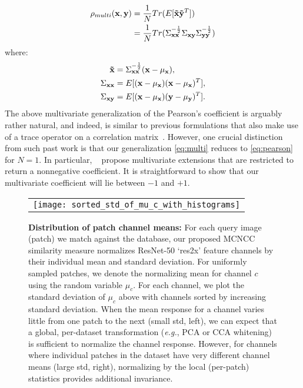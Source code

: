 \documentclass[twocolumn]{svjour3}           %
\newcommand{\eg}{\emph{e.g.}}
\begin{document}
\begin{align}
  \rho_{multi}({\bf x},{\bf y}) &= \frac{1}{N} Tr( E[{\bf \tilde{x} \tilde{y}}^T]) \label{eq:multi}\\
    &= \frac{1}{N}Tr( \Sigma_{\bf xx}^{-\frac{1}{2}} \Sigma_{\bf xy} \Sigma_{\bf yy}^{-\frac{1}{2}}) \nonumber
\end{align}
where:
\begin{align}
  \nonumber{\bf \tilde{x}} &= \Sigma_{\bf xx}^{-\frac{1}{2}}({\bf x} - \mu_{\bf x}), \\
  \nonumber\Sigma_{\bf xx} &= E[({\bf x} - {\bf \mu_x}) ({\bf x} - {\bf \mu_x})^T], \\
  \nonumber\Sigma_{\bf xy} &= E[({\bf x} - {\bf \mu_x}) ({\bf y} - {\bf \mu_y})^T].
\end{align}
The above multivariate generalization of the Pearson's coefficient is arguably
rather natural, and indeed, is similar to previous formulations that also make use
of a trace operator on a correlation
matrix~\cite{martin1979multivariate,popper1974multivariate}. However, one
crucial distinction from such past work is that our generalization
\eqref{eq:multi} reduces to \eqref{eq:pearson} for $N=1$. In particular,
~\cite{martin1979multivariate,popper1974multivariate} propose multivariate
extensions that are restricted to return a nonnegative coefficient. It is
straightforward to show that our multivariate coefficient will lie between $-1$
and $+1$.

\begin{figure}[t]
\begin{center}
\begin{tabular}{c}
  \texttt{[image: sorted\_std\_of\_mu\_c\_with\_histograms]}
  \end{tabular}\vspace{-2mm}
  \end{center}
  \caption{\textbf{Distribution of patch channel means: } 
    For each query image (patch) we match against the database, our proposed
    MCNCC similarity measure normalizes ResNet-50 `res2x' feature channels by
    their individual mean and standard deviation.  For uniformly sampled
    patches, we denote the normalizing mean for channel $c$ using the random
    variable $\mu_c$. For each channel, we plot the standard deviation of
    $\mu_c$ above with channels sorted by increasing standard deviation. When
    the mean response for a channel varies little from one patch to the next
    (small std, left), we can expect that a global, per-dataset transformation
    (\eg, PCA or CCA whitening) is sufficient to normalize the channel response.
    However, for channels where individual patches in the dataset have very
    different channel means (large std, right), normalizing by the local
    (per-patch) statistics provides additional invariance.}
  \label{fig:std_of_mu_histograms}
\end{figure}
\end{document}
